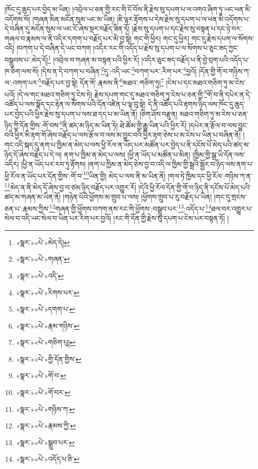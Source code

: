 །ཁོང་དུ་ཆུད་པར་བྱེད་མ་ཡིན། །འབྲེལ་པ་ཅན་གྱི་རང་གི་ངོ་བོས་ནི་རྗེས་སུ་དཔག་པ་ལ་འགའ་ཞིག་ཏུ་ཡང་ཕན་མི་འདོགས་སོ། །གཞན་མིན་མངོན་སུམ་ཡང་མ་ཡིན། །ཇི་ལྟར་རྟོགས་པ་དེས་རྗེས་སུ་དཔག་པ་ལ་ཕན་མི་འདོགས་པ་དེ་བཞིན་དུ་མངོན་སུམ་ལ་ཡང་ངོ་ཞེས་སྔར་བརྗོད་ཟིན་ཏོ། །རྗེས་སུ་དཔག་པ་དང་རྗེས་སུ་བསྟན་པ་དང་ཉེ་བར་གཞལ་བ་རྣམས་ལ་ནི་འདིར་དགག་པ་བརྗོད་པར་མི་བྱ་སྟེ། གང་གི་ཕྱིར། གང་དུ་ཕྱིར། གང་དུ་རྗེས་དཔག་ལ་སོགས་འདི། །བཀག་པ་དེ་བཞིན་དེ་ཡང་བཀག །འདིར་རང་གི་འདོད་པ་རྗེས་སུ་དཔག་པ་ལ་སོགས་པ་ཅུང་ཟད་ཀྱང་བསྒྲུབས་པ་:མེད་དོ།\footnote{«སྣར་»«པེ་»མེད་དེ།} །འབྲེལ་བ་གཞན་མ་བསྟན་པའི་ཕྱིར་རོ། །འདིར་ཅུང་ཟད་བརྗོད་པ་ནི་བྱེ་བྲག་པའི་འདོད་པ་ཁ་ཅིག་ལས་སོ། །དེས་ན་དེ་བཀག་པ་བཞིན་\footnote{«སྣར་»«པེ་»གཞན་}དུ་:འདི་ཡང་\footnote{«སྣར་»«པེ་»འདི་}བཀག་པར་:རིག་པར་\footnote{«སྣར་»«པེ་»རིགས་པར་}བྱའོ། །དོན་གྱི་གོ་བ་གཉིས་ཀ་ལ་:འགག་པར་\footnote{«སྣར་»«པེ་»དགག་པ་}བརྗོད་པར་བྱ་སྟེ། དོན་གོ་:རྣམས་ནི་\footnote{«སྣར་»«པེ་»རྣམ་གཉིས་}མཐའ་:གཅིག་ཏུ།\footnote{«སྣར་»«པེ་»གཅིག་པུ།} །ངེས་པ་དང་མཐའ་གཅིག་ཏུ་མ་ངེས་པའོ། །དེ་ལ་གང་མཐའ་གཅིག་ཏུ་ངེས་ཏེ། རྗེས་དཔག་གང་དུ་མཐའ་གཅིག་ཏུ་ངེས་པ་ཅན་གྱི་\footnote{«སྣར་»«པེ་»གྱི་དོན་གྱིས་}གོ་བ་ནི་དཔེར་ན་དེ་འཚོད་པ་ལས་སྣོད་དང་རྟེན་ལ་སོགས་པའི་དོན་འཛིན་པ་ལྟ་བུ་སྟེ། དེ་ནི་འཚོད་པའི་རྟགས་ཉིད་ལས་ཁོང་དུ་ཆུད་པར་བྱེད་པའི་ཕྱིར་རྗེས་སུ་དཔག་པ་ལས་ཐ་དད་པ་མ་ཡིན་ནོ། །ཅིག་ཤོས་བརྫུན། མཐའ་གཅིག་ཏུ་མ་ངེས་པ་ཅན་ཉིད་ཀྱི་དོན་གྱིས་:གོ་བས་\footnote{«སྣར་»«པེ་»གོ་བ་}ནི་ཚད་མ་ཉིད་མ་ཡིན་ཏེ། ཐེ་ཚོམ་གྱི་རྒྱུ་ཡིན་པའི་ཕྱིར་རོ། །དཔེར་ན་རྩོལ་བ་ལས་བྱུང་བའི་ཕྱིར་མི་རྟག་གོ་ཞེས་བརྗོད་པ་ལས་རྩོལ་བ་ལས་མ་བྱུང་བའི་ཕྱིར་རྟག་ཅེས་པ་མ་ངེས་པ་ཡིན་པ་བཞིན་ནོ། །གང་འདི་སྐད་དུ་ནག་པ་ཁྱིམ་ན་མེད་པ་ལས་ཕྱི་རོལ་ན་ཡོད་པར་མཚོན་པར་བྱེད་པ་ནི་དངོས་པོ་མེད་པའི་ཚད་མ་ཉིད་དོ་ཞེས་བརྗོད་པ་དེ་ལ། ནག་པ་ཁྱིམ་ན་མེད་པ་ལས། །ཕྱི་ན་ཡོད་པ་མཚོན་པ་མིན། །ཁྱིམ་གྱི་སྒྲ་ཡི་དོན་ལས་འདིར། །ཕྱི་ན་ཡོད་པར་རབ་ཏུ་རྟོགས། །ནག་པ་ཁྱིམ་ན་མེད་ཅེས་བྱ་བ་འདི་ལ་ཁྱིམ་གྱི་སྒྲའི་སྦྱོར་བ་ཉིད་ལས་ནག་པ་ཕྱི་རོལ་ན་ཡོད་པར་དོན་གྱིས་:གོ་བ་\footnote{«སྣར་»«པེ་»གོ་བར་}ཡིན་གྱི། མེད་པ་ལས་ནི་མ་ཡིན་ནོ། །གལ་ཏེ་ཁྱིམ་དང་ཕྱི་རོལ་:གཉིས་ཀ་ན་\footnote{«སྣར་»«པེ་»གཉིས་ཀ་}མེད་ན་ནི་མེད་དོ་ཞེས་བྱ་བ་ཙམ་ཉིད་བརྗོད་པར་འགྱུར་རོ། །དེའི་ཕྱི་རོལ་དོན་གྱི་གོ་བ་ཉིད་ནི་དངོས་པོ་མེད་པའི་ཚད་མ་གཞན་མ་ཡིན་ནོ། །གཉེན་པོའི་ཕྱོགས་མ་གྲུབ་པ་ལས། །ཕྱོགས་གྲུབ་པ་རུ་བརྗོད་པ་ཡིན། །གང་དུ་གྲངས་ཅན་པ་:རྣམས་ཀྱིས་\footnote{«སྣར་»«པེ་»རྣམས་ཀྱི་}གཞན་གྱི་ཕྱོགས་བཀག་ནས་རང་གི་ཕྱོགས་:བསྒྲུབ་པར་\footnote{«སྣར་»«པེ་»སྒྲུབ་པར་}:འདོད་པ་\footnote{«སྣར་»«པེ་»འདོད་པ་ཅི་}ཐལ་བར་འགྱུར་པ་སེལ་བ་འདི་ཡང་སེལ་བ་ཡིན་པར་རིག་པར་བྱའོ། །རང་གི་དོན་གྱི་རྗེས་སུ་དཔག་པ་ངེས་པར་བསྟན་ཏོ། །
